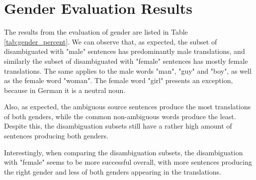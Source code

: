 \section{Gender Evaluation Results}
\label{ch:Results:Gender}

The results from the evaluation of gender are listed in Table \ref{tab:gender_percent}. We can observe that, as expected, the subset of disambiguated with "male" sentences has predominantly male translations, and similarly the subset of disambiguated with "female" sentences has mostly female translations. The same applies to the male words "man", "guy" and "boy", as well as the female word "woman". The female word "girl" presents an exception, because in German it is a neutral noun.

Also, as expected, the ambiguous source sentences produce the most translations of both genders, while the common non-ambiguous words produce the least. Despite this, the disambiguation subsets still have a rather high amount of sentences producing both genders. 

Interestingly, when comparing the disambiguation subsets, the disambiguation with "female" seems to be more successful overall, with more sentences producing the right gender and less of both genders appearing in the translations.

